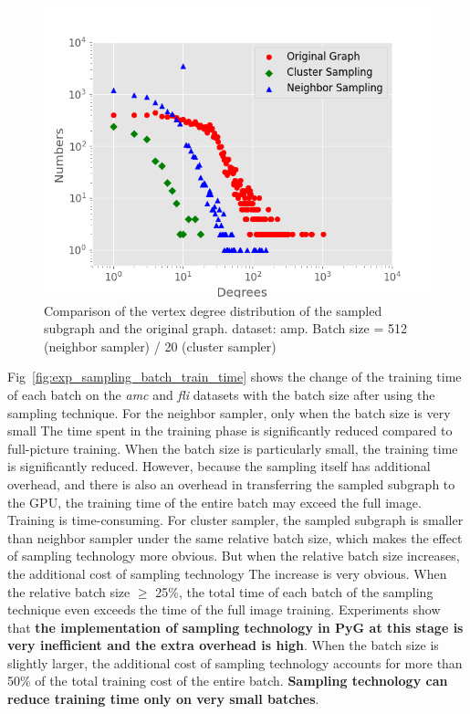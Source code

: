 {\begin{figure}
    \centering
    \includegraphics[width=0.7\columnwidth]{figs/experiments/exp_sampling_minibatch_degrees_distribution_amazon-photo.png}
    \caption{Comparison of the vertex degree distribution of the sampled subgraph and the original graph. dataset: amp. Batch size = 512 (neighbor sampler) / 20 (cluster sampler)}
    \label{fig:exp_sampling_minibatch_degrees_distribution}
\end{figure}

Fig~\ref{fig:exp_sampling_batch_train_time} shows the change of the training time of each batch on the \textit{amc} and \textit{fli} datasets with the batch size after using the sampling technique.
For the neighbor sampler, only when the batch size is very small The time spent in the training phase is significantly reduced compared to full-picture training. 
When the batch size is particularly small, the training time is significantly reduced. However, because the sampling itself has additional overhead, 
and there is also an overhead in transferring the sampled subgraph to the GPU, the training time of the entire batch may exceed the full image. 
Training is time-consuming. For cluster sampler, the sampled subgraph is smaller than neighbor sampler under the same relative batch size,
which makes the effect of sampling technology more obvious. But when the relative batch size increases, 
the additional cost of sampling technology The increase is very obvious. When the relative batch size $\geq$ 25\%,
the total time of each batch of the sampling technique even exceeds the time of the full image training. 
Experiments show that \textbf{the implementation of sampling technology in PyG at this stage is very inefficient and the extra overhead is high}.
When the batch size is slightly larger, the additional cost of sampling technology accounts for more than 50\% of the total training cost of the entire batch.
\textbf{Sampling technology can reduce training time only on very small batches}.

}
